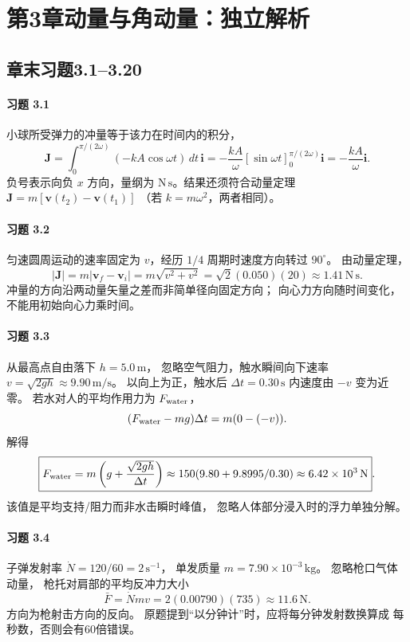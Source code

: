 \section*{第3章\quad 动量与角动量：独立解析}
\subsection*{章末习题3.1--3.20}

\paragraph{习题 3.1}
小球所受弹力的冲量等于该力在时间内的积分，
\[
 \boldsymbol J=\int_0^{\pi/(2\omega)}
 (-kA\cos\omega t)\,dt\,\boldsymbol i
 =-\frac{kA}{\omega}
 \left[\sin\omega t\right]_0^{\pi/(2\omega)}\boldsymbol i
 =\boxed{-\frac{kA}{\omega}\boldsymbol i}.
\]
负号表示向负 \(x\) 方向，量纲为
\(\mathrm{N\,s}\)。结果还须符合动量定理
\(\boldsymbol J=m[\boldsymbol v(t_2)-\boldsymbol v(t_1)]\)
（若 \(k=m\omega^2\)，两者相同）。

\paragraph{习题 3.2}
匀速圆周运动的速率固定为 \(v\)，经历 \(1/4\)
周期时速度方向转过 \(90^\circ\)。
由动量定理，
\[
 |\boldsymbol J|=m|\boldsymbol v_f-\boldsymbol v_i|
 =m\sqrt{v^2+v^2}
 =\sqrt2(0.050)(20)
 \approx\boxed{1.41\,\mathrm{N\,s}}.
\]
冲量的方向沿两动量矢量之差而非简单径向固定方向；
向心力方向随时间变化，不能用初始向心力乘时间。

\paragraph{习题 3.3}
从最高点自由落下 \(h=5.0\,\mathrm m\)，
忽略空气阻力，触水瞬间向下速率
\(v=\sqrt{2gh}\approx9.90\,\mathrm{m/s}\)。
以向上为正，触水后
\(\Delta t=0.30\,\mathrm s\) 内速度由 \(-v\) 变为近零。
若水对人的平均作用力为 \(F_{\rm water}\)，
\[
 (F_{\rm water}-mg)\Delta t
 =m(0-(-v)).
\]
解得
\[
 \boxed{F_{\rm water}=m\left(g+\frac{\sqrt{2gh}}{\Delta t}\right)
 \approx150(9.80+9.8995/0.30)
 \approx6.42\times10^3\,\mathrm N}.
\]
该值是平均支持/阻力而非水击瞬时峰值，
忽略人体部分浸入时的浮力单独分解。

\paragraph{习题 3.4}
子弹发射率
\(\dot N=120/60=2\,\mathrm{s^{-1}}\)，
单发质量 \(m=7.90\times10^{-3}\,\mathrm{kg}\)。
忽略枪口气体动量，
枪托对肩部的平均反冲力大小
\[
 \boxed{\bar F=\dot Nmv
 =2(0.00790)(735)\approx11.6\,\mathrm N}.
\]
方向为枪射击方向的反向。
原题提到“以分钟计”时，应将每分钟发射数换算成
每秒数，否则会有60倍错误。

